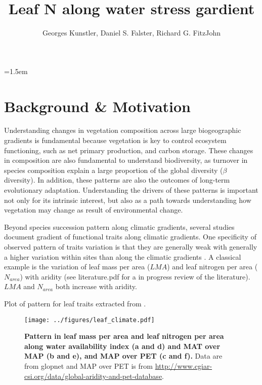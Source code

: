 \documentclass[a4paper,11pt]{article}
\title{Leaf N along water stress gardient}
\author{Georges Kunstler, Daniel S. Falster, Richard G. FitzJohn}
\date{}
\affiliation{Irstea Grenoble France}
\affiliation{Department of Biological Sciences, Macquarie University,
  Sydney, Australia}
\begin{document}
\mstitleshort
\parindent=1.5em
\addtolength{\parskip}{.3em}


\section{Background \& Motivation}

Understanding changes in vegetation composition across large biogeographic gradients is fundamental because vegetation is key to control ecosystem functioning, such as net primary production, and carbon storage. These changes in composition are also fundamental to understand biodiversity, as turnover in species composition explain a large proportion of the global diversity ($\beta$ diversity). In addition, these patterns are also the outcomes of long-term evolutionary adaptation. Understanding the drivers of these patterns is important not only for its intrinsic interest, but also as a path towards understanding how vegetation may change as result of environmental change.

Beyond species succession pattern along climatic gradients, several studies document gradient of functional traits along climatic gradients. One specificity of observed pattern of traits variation is that they are generally weak with generally a higher variation within sites than along the climatic gradients \citep[see][]{Wright-2004}. A classical example is the variation of leaf mass per area ($LMA$) and leaf nitrogen per area ($N_{area}$) with aridity (see literature.pdf for a in progress review of the literature). $LMA$ \citep{Wright-2004,Onoda-2011,Moles-2014} and $N_{area}$ \citep{Wright-2005,Maire-2015} both increase with aridity. 

\clearpage


Plot of pattern for leaf traits extracted from \citep{Wright-2004}.

\begin{figure}[ht]
\centering
\texttt{[image: ../figures/leaf\_climate.pdf]}
\caption{\textbf{Pattern in leaf mass per area and leaf nitrogen per area along water availability index (a and d) and MAT over MAP (b and e), and MAP over PET (c and f).} Data are from glopnet \citep{Wright-2004} and MAP over PET is from \url{http://www.cgiar-csi.org/data/global-aridity-and-pet-database}.
\label{fig:leafpattern}}
\end{figure}
\end{document}
